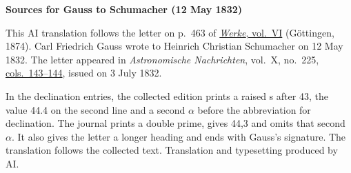 \clearpage\thispagestyle{empty}
\begin{center}\textbf{Sources for Gauss to Schumacher (12 May 1832)}\end{center}
\noindent This AI translation follows the letter on p.~463 of \href{https://gdz.sub.uni-goettingen.de/id/PPN236007467}{\textit{Werke}, vol.~VI} (Göttingen, 1874). Carl Friedrich Gauss wrote to Heinrich Christian Schumacher on 12 May 1832. The letter appeared in \textit{Astronomische Nachrichten}, vol.~X, no.~225, \href{https://api.digitale-sammlungen.de/iiif/image/v2/bsb10049435_00080/full/1800,/0/default.jpg}{cols.~143--144}, issued on 3 July 1832.
\par\smallskip\noindent In the declination entries, the collected edition prints a raised \textup{s} after 43, the value 44.4 on the second line and a second $\alpha$ before the abbreviation for declination. The journal prints a double prime, gives 44,3 and omits that second $\alpha$. It also gives the letter a longer heading and ends with Gauss’s signature. The translation follows the collected text. Translation and typesetting produced by AI.
\clearpage

